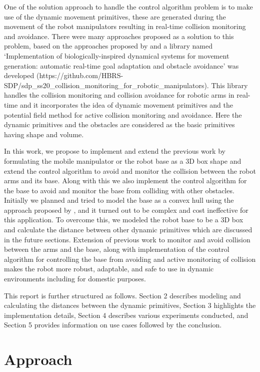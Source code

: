 \documentclass[a4paper, 11.5pt, conference]{ieeeconf}      %
\begin{document}
One of the solution approach to handle the control algorithm problem is to make use of the dynamic movement primitives, these are generated during the movement of the robot manipulators resulting in real-time collision monitoring and avoidance. There were many approaches proposed as a solution to this problem, based on the approaches proposed by \cite{Hoffmann} and \cite{Khatib} a library named `Implementation of biologically-inspired dynamical systems for
movement generation: automatic real-time goal adaptation and obstacle avoidance' was developed (https://github.com/HBRS-SDP/sdp\_ss20\_collision\_monitoring\_for\_robotic\_manipulators). This library handles the collision monitoring and collision avoidance for robotic arms in real-time and it incorporates the idea of dynamic movement primitives and the potential field method for active collision monitoring and avoidance. Here the dynamic primitives and the obstacles are considered as the basic primitives having shape and volume.

In this work, we propose to implement and extend the previous work by formulating the mobile manipulator or the robot base as a 3D box shape and extend the control algorithm to avoid and monitor the collision between the robot arms and its base. Along with this we also implement the control algorithm for the base to avoid and monitor the base from colliding with other obstacles. Initially we planned and tried to model the base as a convex hull using the approach proposed by \cite{GJK}, and it turned out to be complex and cost ineffective for this application. To overcome this, we modeled the robot base to be a 3D box and calculate the distance between other dynamic primitives which are discussed in the future sections. Extension of previous work to monitor and avoid collision between the arms and the base, along with implementation of the control algorithm for controlling the base from avoiding and active monitoring of collision makes the robot more robust, adaptable, and safe to use in dynamic environments including for domestic purposes.

This report is further structured as follows. Section 2 describes modeling and  calculating the distances between the dynamic primitives, Section 3 highlights the implementation details, Section 4 describes various experiments conducted, and Section 5 provides information on use cases followed by the conclusion.

\section{Approach}
\end{document}
